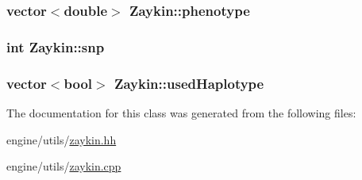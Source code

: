 \label{classZaykin_ad0b5f025c5cffe4ef14f1685e956faa5}
\hypertarget{classZaykin_a19b6fa76c263b5eb7793957770bd4e22}{
\subsubsection[{phenotype}]{\setlength{\rightskip}{0pt plus 5cm}vector$<$double$>$ {\bf Zaykin::phenotype}}}
\label{classZaykin_a19b6fa76c263b5eb7793957770bd4e22}
\hypertarget{classZaykin_a03181d0afbfb93c0206e5c679561cafb}{
\subsubsection[{snp}]{\setlength{\rightskip}{0pt plus 5cm}int {\bf Zaykin::snp}}}
\label{classZaykin_a03181d0afbfb93c0206e5c679561cafb}
\hypertarget{classZaykin_a7f47e07456e480212833d09b732be913}{
\subsubsection[{usedHaplotype}]{\setlength{\rightskip}{0pt plus 5cm}vector$<$bool$>$ {\bf Zaykin::usedHaplotype}}}
\label{classZaykin_a7f47e07456e480212833d09b732be913}


The documentation for this class was generated from the following files:\begin{DoxyCompactItemize}
\item 
engine/utils/\hyperlink{zaykin_8hh}{zaykin.hh}\item 
engine/utils/\hyperlink{zaykin_8cpp}{zaykin.cpp}\end{DoxyCompactItemize}
